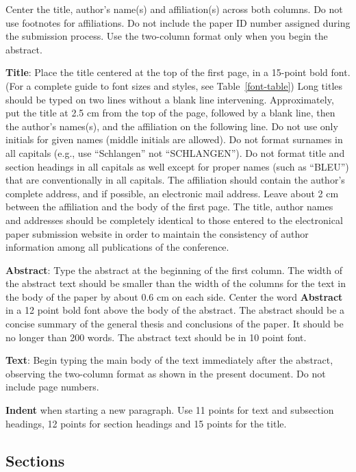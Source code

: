 \documentclass[11pt]{article}
\begin{document}
Center the title, author's name(s) and affiliation(s) across both
columns. Do not use footnotes for affiliations. Do not include the
paper ID number assigned during the submission process. Use the
two-column format only when you begin the abstract.

{\bf Title}: Place the title centered at the top of the first page, in
a 15-point bold font. (For a complete guide to font sizes and styles, see Table~\ref{font-table}) Long titles should be typed on two lines without
a blank line intervening. Approximately, put the title at 2.5 cm from
the top of the page, followed by a blank line, then the author's
names(s), and the affiliation on the following line. Do not use only
initials for given names (middle initials are allowed). Do not format surnames
in all capitals (e.g., use ``Schlangen'' not ``SCHLANGEN'').
Do not format title and section headings in all capitals as well
except for proper names (such as ``BLEU'') that are conventionally
in all capitals.
The affiliation should contain the author's complete address, and if
possible, an electronic mail address. Leave about 2 cm between the
affiliation and the body of the first page.
The title, author names and addresses should be completely
identical to those entered to the electronical paper submission
website in order to maintain the consistency of author information
among all publications of the conference.

{\bf Abstract}: Type the abstract at the beginning of the first
column. The width of the abstract text should be smaller than the
width of the columns for the text in the body of the paper by about
0.6 cm on each side. Center the word {\bf Abstract} in a 12 point bold
font above the body of the abstract. The abstract should be a concise
summary of the general thesis and conclusions of the paper. It should
be no longer than 200 words. The abstract text should be in 10 point font.

{\bf Text}: Begin typing the main body of the text immediately after
the abstract, observing the two-column format as shown in 
the present document. Do not include page numbers.

{\bf Indent} when starting a new paragraph. Use 11 points for text and 
subsection headings, 12 points for section headings and 15 points for
the title. 

\subsection{Sections}
\end{document}
